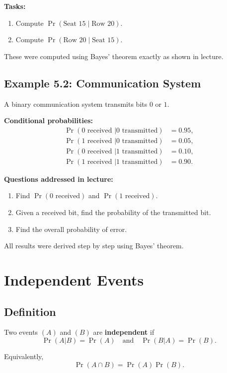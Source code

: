 \documentclass[11pt]{article}
\begin{document}
\textbf{Tasks:}
\begin{enumerate}
  \item Compute $\Pr(\text{Seat 15} \mid \text{Row 20})$.
  \item Compute $\Pr(\text{Row 20} \mid \text{Seat 15})$.
\end{enumerate}

These were computed using Bayes' theorem exactly as shown in lecture.

\subsection{Example 5.2: Communication System}

A binary communication system transmits bits $0$ or $1$.

\textbf{Conditional probabilities:}
\[
\begin{aligned}
\Pr(0 \text{ received }|0 \text{ transmitted}) &= 0.95,\\
\Pr(1 \text{ received }|0 \text{ transmitted}) &= 0.05,\\
\Pr(0 \text{ received }|1 \text{ transmitted}) &= 0.10,\\
\Pr(1 \text{ received }|1 \text{ transmitted}) &= 0.90.
\end{aligned}
\]

\textbf{Questions addressed in lecture:}
\begin{enumerate}
  \item Find $\Pr(0 \text{ received})$ and $\Pr(1 \text{ received})$.
  \item Given a received bit, find the probability of the transmitted bit.
  \item Find the overall probability of error.
\end{enumerate}

All results were derived step by step using Bayes' theorem.

\section{Independent Events}

\subsection{Definition}

Two events $(A)$ and $(B)$ are \textbf{independent} if
\[
\Pr(A|B) = \Pr(A)
\quad \text{and} \quad
\Pr(B|A) = \Pr(B).
\]

Equivalently,
\[
\Pr(A \cap B) = \Pr(A)\Pr(B).
\]
\end{document}
